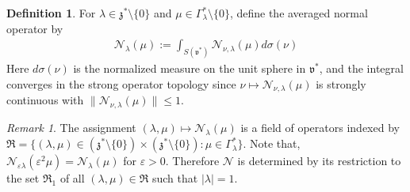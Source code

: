 \documentclass[11pt]{amsart}
\theoremstyle{plain}
\theoremstyle{definition}
\newtheorem{definition}[theorem]{Definition}
\theoremstyle{remark}
\newtheorem{remark}[theorem]{Remark}
\numberwithin{equation}{section}
\def\fz{\mathfrak{z}}
\def\fv{\mathfrak{v}}
\def\cN{\mathcal{N}}
\def\mz{\setminus\{0\}}
\def\eps{\varepsilon}
\numberwithin{equation}{section}
\begin{document}
\begin{definition} For $\lambda\in \fz^*\mz$ and $\mu\in \Gamma_\lambda^*\mz$, define the averaged normal operator by
	\begin{align*}
		\cN_\lambda(\mu):=\int_{S(\fv^*)}\cN_{\nu, \lambda}(\mu)d\sigma(\nu)
	\end{align*}
Here $d\sigma(\nu)$ is the normalized measure on the unit sphere in $\fv^*$, and the integral converges in the strong operator topology since $\nu\mapsto\cN_{\nu, \lambda}(\mu)$ is strongly continuous with $\|\cN_{\nu, \lambda}(\mu)\|\leq 1$. 
\end{definition}
\begin{remark}\label{r:scaleN}
	The assignment $(\lambda, \mu)\mapsto \cN_{\lambda}(\mu)$ is a field of operators indexed by $\mathfrak{R}=\{(\lambda, \mu)\in (\fz^*\mz) \times(\fz^*\mz): \mu\in \Gamma_\lambda^*\}$. Note that,  $\cN_{\eps\lambda}(\eps^2\mu)=\cN_{\lambda}(\mu)$ for $\eps>0$.  Therefore $\cN$ is determined by its restriction to the set $\mathfrak{R}_1$ of all $(\lambda, \mu)\in \mathfrak{R}$ such that $|\lambda|=1$.
\end{remark}
\end{document}
